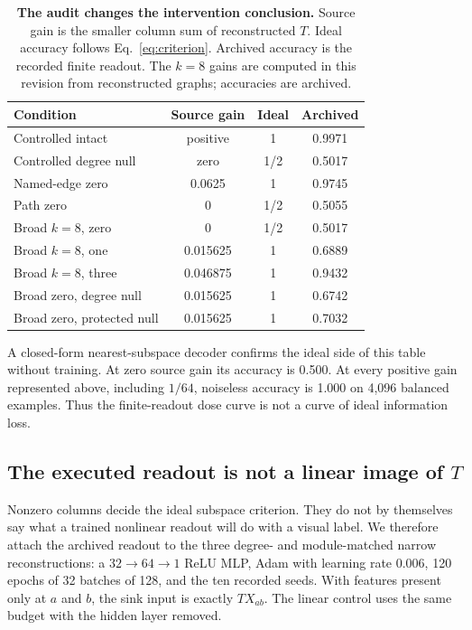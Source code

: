 \begin{table}[t]
\centering
\caption{\textbf{The audit changes the intervention conclusion.} Source gain
is the smaller column sum of reconstructed $T$. Ideal accuracy follows
Eq.~\eqref{eq:criterion}. Archived accuracy is the recorded finite readout.
The $k=8$ gains are computed in this revision from reconstructed graphs;
accuracies are archived.}
\label{tab:audit}
\small
\begin{tabular}{@{}lccc@{}}
\toprule
Condition & Source gain & Ideal & Archived \\
\midrule
Controlled intact & positive & 1 & 0.9971 \\
Controlled degree null & zero & 1/2 & 0.5017 \\
Named-edge zero & 0.0625 & 1 & 0.9745 \\
Path zero & 0 & 1/2 & 0.5055 \\
Broad $k=8$, zero & 0 & 1/2 & 0.5017 \\
Broad $k=8$, one & 0.015625 & 1 & 0.6889 \\
Broad $k=8$, three & 0.046875 & 1 & 0.9432 \\
Broad zero, degree null & 0.015625 & 1 & 0.6742 \\
Broad zero, protected null & 0.015625 & 1 & 0.7032 \\
\bottomrule
\end{tabular}
\end{table}

A closed-form nearest-subspace decoder confirms the ideal side of this table
without training. At zero source gain its accuracy is 0.500. At every positive
gain represented above, including $1/64$, noiseless accuracy is 1.000 on
4,096 balanced examples. Thus the finite-readout dose curve is not a curve of
ideal information loss.
\subsection{The executed readout is not a linear image of $T$}
\label{sec:images}

Nonzero columns decide the ideal subspace criterion. They do not by themselves
say what a trained nonlinear readout will do with a visual label. We therefore
attach the archived readout to the three degree- and module-matched narrow
reconstructions: a $32\!\to\!64\!\to\!1$ ReLU MLP, Adam with learning rate
0.006, 120 epochs of 32 batches of 128, and the ten recorded seeds. With
features present only at $a$ and $b$, the sink input is exactly $TX_{ab}$.
The linear control uses the same budget with the hidden layer removed.

